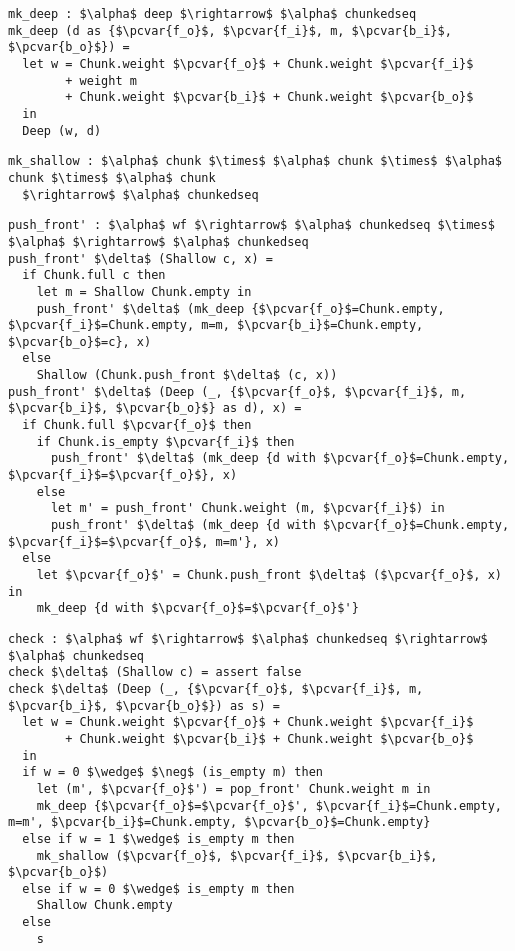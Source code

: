 \documentclass[10pt]{article}
\newcommand{\pcvar}[1]{\mathtt{#1}}
\begin{document}
\begin{lstlisting}[language=pcpp,style=nonumbers]
mk_deep : $\alpha$ deep $\rightarrow$ $\alpha$ chunkedseq
mk_deep (d as {$\pcvar{f_o}$, $\pcvar{f_i}$, m, $\pcvar{b_i}$, $\pcvar{b_o}$}) =
  let w = Chunk.weight $\pcvar{f_o}$ + Chunk.weight $\pcvar{f_i}$
        + weight m
        + Chunk.weight $\pcvar{b_i}$ + Chunk.weight $\pcvar{b_o}$
  in
  Deep (w, d)
\end{lstlisting}

\begin{lstlisting}[language=pcpp,style=nonumbers]
mk_shallow : $\alpha$ chunk $\times$ $\alpha$ chunk $\times$ $\alpha$ chunk $\times$ $\alpha$ chunk
  $\rightarrow$ $\alpha$ chunkedseq
\end{lstlisting}

\begin{lstlisting}[language=pcpp,style=nonumbers]
push_front' : $\alpha$ wf $\rightarrow$ $\alpha$ chunkedseq $\times$ $\alpha$ $\rightarrow$ $\alpha$ chunkedseq
push_front' $\delta$ (Shallow c, x) =
  if Chunk.full c then
    let m = Shallow Chunk.empty in
    push_front' $\delta$ (mk_deep {$\pcvar{f_o}$=Chunk.empty, $\pcvar{f_i}$=Chunk.empty, m=m, $\pcvar{b_i}$=Chunk.empty, $\pcvar{b_o}$=c}, x)
  else
    Shallow (Chunk.push_front $\delta$ (c, x))
push_front' $\delta$ (Deep (_, {$\pcvar{f_o}$, $\pcvar{f_i}$, m, $\pcvar{b_i}$, $\pcvar{b_o}$} as d), x) =
  if Chunk.full $\pcvar{f_o}$ then
    if Chunk.is_empty $\pcvar{f_i}$ then
      push_front' $\delta$ (mk_deep {d with $\pcvar{f_o}$=Chunk.empty, $\pcvar{f_i}$=$\pcvar{f_o}$}, x)
    else
      let m' = push_front' Chunk.weight (m, $\pcvar{f_i}$) in
      push_front' $\delta$ (mk_deep {d with $\pcvar{f_o}$=Chunk.empty, $\pcvar{f_i}$=$\pcvar{f_o}$, m=m'}, x)
  else
    let $\pcvar{f_o}$' = Chunk.push_front $\delta$ ($\pcvar{f_o}$, x) in
    mk_deep {d with $\pcvar{f_o}$=$\pcvar{f_o}$'}
\end{lstlisting}

\begin{lstlisting}[language=pcpp,style=nonumbers]
check : $\alpha$ wf $\rightarrow$ $\alpha$ chunkedseq $\rightarrow$ $\alpha$ chunkedseq
check $\delta$ (Shallow c) = assert false
check $\delta$ (Deep (_, {$\pcvar{f_o}$, $\pcvar{f_i}$, m, $\pcvar{b_i}$, $\pcvar{b_o}$}) as s) =
  let w = Chunk.weight $\pcvar{f_o}$ + Chunk.weight $\pcvar{f_i}$
        + Chunk.weight $\pcvar{b_i}$ + Chunk.weight $\pcvar{b_o}$
  in
  if w = 0 $\wedge$ $\neg$ (is_empty m) then
    let (m', $\pcvar{f_o}$') = pop_front' Chunk.weight m in
    mk_deep {$\pcvar{f_o}$=$\pcvar{f_o}$', $\pcvar{f_i}$=Chunk.empty, m=m', $\pcvar{b_i}$=Chunk.empty, $\pcvar{b_o}$=Chunk.empty}
  else if w = 1 $\wedge$ is_empty m then
    mk_shallow ($\pcvar{f_o}$, $\pcvar{f_i}$, $\pcvar{b_i}$, $\pcvar{b_o}$)
  else if w = 0 $\wedge$ is_empty m then
    Shallow Chunk.empty
  else
    s
\end{lstlisting}
\end{document}
